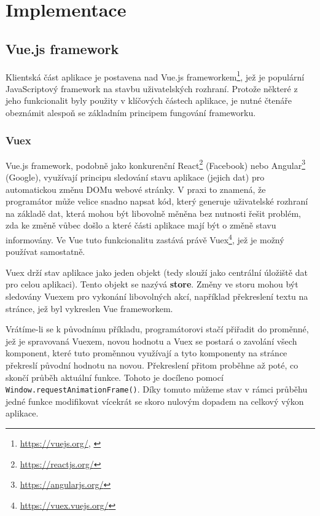 \chapter{Implementace}

\section{Vue.js framework}
Klientská část aplikace je postavena nad Vue.js frameworkem\footnote{\url{https://vuejs.org/}, \citet*{Vue}}, jež je populární JavaScriptový framework na stavbu uživatelských rozhraní. Protože některé z jeho funkcionalit byly použity v klíčových částech aplikace, je nutné čtenáře obeznámit alespoň se základním principem fungování frameworku.

\subsection{Vuex}
Vue.js framework, podobně jako konkurenční React\footnote{\url{https://reactjs.org/}} (Facebook) nebo Angular\footnote{\url{https://angularjs.org/}} (Google), využívají principu sledování stavu aplikace (jejich dat) pro automatickou změnu DOMu webové stránky. V praxi to znamená, že programátor může velice snadno napsat kód, který generuje uživatelské rozhraní na základě dat, která mohou být libovolně měněna bez nutnosti řešit problém, zda ke změně vůbec došlo a které části aplikace mají být o změně stavu informovány. Ve Vue tuto funkcionalitu zastává právě Vuex\footnote{\url{https://vuex.vuejs.org/}}, jež je možný používat samostatně.

Vuex drží stav aplikace jako jeden objekt (tedy slouží jako centrální úložiště dat pro celou aplikaci). Tento objekt se nazývá \textbf{store}. Změny ve storu mohou být sledovány Vuexem pro vykonání libovolných akcí, například překreslení textu na stránce, jež byl vykreslen Vue frameworkem.

\newcommand{\inlinecode}{\texttt}

Vrátíme-li se k původnímu příkladu, programátorovi stačí přiřadit do proměnné, jež je spravovaná Vuexem, novou hodnotu a Vuex se postará o zavolání všech komponent, které tuto proměnnou využívají a tyto komponenty na stránce překreslí původní hodnotu na novou. Překreslení přitom proběhne až poté, co skončí průběh aktuální funkce. Tohoto je docíleno pomocí \\  \texttt{Window.requestAnimationFrame()}. Díky tomuto můžeme stav v rámci průběhu jedné funkce modifikovat vícekrát se skoro nulovým dopadem na celkový výkon aplikace.

